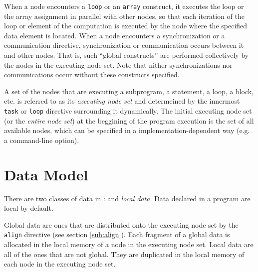 
When a node encounters a {\tt loop} or an {\tt array} construct, it
executes the loop or the array assignment in parallel with other nodes,
so that each iteration of the loop or element of the computation is
executed by the node where the specified data element is located.
%
When a node encounters a synchronization or a communication directive,
synchronization or communication occurs between it and other nodes.
%
That is, such ``global constructs'' are performed collectively by the
nodes in the executing node set.
%
Note that nither synchronizations nor communications occur without these
constructs specified.



A set of the nodes that are executing a subprogram, a statement, a loop,
a block, etc. is referred to as its {\it executing node set} and
determeined by the innermost {\tt task} or {\tt loop} directive
surrounding it dynamically.
%
The initial executing node set (or the {\it entire node set}) at the
beggining of the program execution is the set of all available nodes,
which can be specified in a implementation-dependent way (e.g. a
command-line option).

\section{Data Model}


There are two classes of data in {\XMP}: {\it {}} and
{\it local data}. Data declared in a program are local by default.

Global data are ones that are distributed onto the executing node set by
the {\tt align} directive (see section \ref{sub:align}). Each fragment
of a global data is allocated in the local memory of a node in the
executing node set.
%
%
Local data are all of the ones that are not global. They are duplicated
in the local memory of each node in the executing node set.

